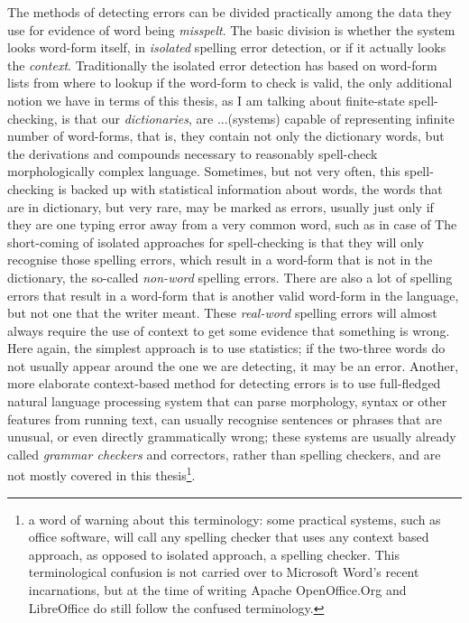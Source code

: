 \documentclass[officiallayout,draft]{unihelcompling}
\begin{document}
The methods of detecting errors can be divided practically among the data they
use for evidence of word being \emph{misspelt}. The basic division is whether
the system looks word-form itself, in \emph{isolated} spelling error detection,
or if it actually looks the \emph{context}. Traditionally the isolated error
detection has based on word-form lists from where to lookup if the word-form
to check is valid, the only additional notion we have in terms of this thesis,
as I am talking about finite-state spell-checking, is that our 
\emph{dictionaries}, are ...(systems) capable of representing infinite number
of word-forms, that is, they contain not only the dictionary words, but the
derivations and compounds necessary to reasonably spell-check morphologically
complex language. Sometimes, but not very often, this spell-checking is
backed up with statistical information about words, the words that are in
dictionary, but very rare, may be marked as errors, usually just only if they
are one typing error away from a very common word, such as in case of
The short-coming of isolated approaches for spell-checking
is that they will only recognise those spelling errors, which result in a
word-form that is not in the dictionary, the so-called \emph{non-word}
spelling errors. There are also a lot of spelling errors that result in a
word-form that is another valid word-form in the language, but not one that
the writer meant. These \emph{real-word} spelling errors will almost always
require the use of context to get some evidence that something is wrong. Here
again, the simplest approach is to use statistics; if the two-three words do not
usually appear around the one we are detecting, it may be an error. Another,
more elaborate context-based method for detecting errors is to use full-fledged
natural language processing system that can parse morphology, syntax or other
features from running text, can usually recognise sentences or phrases that
are unusual, or even directly grammatically wrong; these systems are usually
already called \emph{grammar checkers} and correctors, rather than spelling
checkers, and are not mostly covered in this thesis\footnote{a word of warning
    about this terminology: some practical systems, such as office software,
    will call any spelling checker that uses any context based approach,
    as opposed to isolated approach, a spelling checker. This terminological
    confusion is not carried over to Microsoft Word's recent incarnations, but
    at the time of writing Apache OpenOffice.Org and LibreOffice do still follow
the confused terminology.}.
\end{document}
